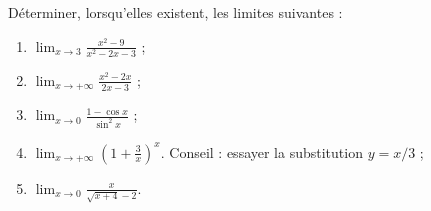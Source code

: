 
\begin{exercice}\label{exointerro-0003}

Déterminer, lorsqu'elles existent, les limites suivantes :
\begin{enumerate}
\item 
  $\displaystyle \lim_{x\to 3} \frac{x^2-9}{x^2-2x-3}$ ;
  \item
    $\displaystyle \lim_{x\to +\infty}\frac{x^2-2x}{2x-3}$ ;
    \item
      $\displaystyle \lim_{x\to 0}\frac{1-\cos x}{\sin^2 x}$ ;
      \item
        $\displaystyle \lim_{x\to +\infty}\left(1+\frac{3}{x}\right)^x$. Conseil : essayer la substitution $y=x/3$ ;
        \item
          $\displaystyle \lim_{x\to 0}\frac{x}{\sqrt{x+4}-2}$.
          
\end{enumerate}


\end{exercice}
